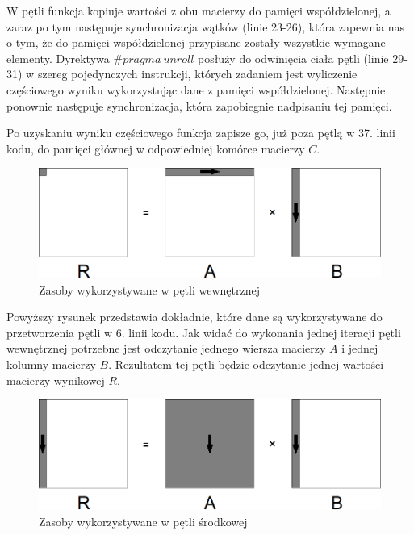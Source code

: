 \documentclass{article}
\begin{document}
W pętli funkcja kopiuje wartości z obu macierzy do pamięci współdzielonej, a zaraz po tym następuje synchronizacja wątków (linie 23-26), która zapewnia nas o tym, że do pamięci współdzielonej przypisane zostały wszystkie wymagane elementy. Dyrektywa $\#pragma\ unroll$ posłuży do odwinięcia ciała pętli (linie 29-31) w szereg pojedynczych instrukcji, których zadaniem jest wyliczenie częściowego wyniku wykorzystując dane z pamięci współdzielonej. Następnie ponownie następuje synchronizacja, która zapobiegnie nadpisaniu tej pamięci.

Po uzyskaniu wyniku częściowego funkcja zapisze go, już poza pętlą w 37. linii kodu, do pamięci głównej w odpowiedniej komórce macierzy $C$.

\begin{figure}[H]
	\centering
	\includegraphics[width=\linewidth]{./images/3/lokIn.png}
	\caption{Zasoby wykorzystywane w pętli wewnętrznej}
	\label{fig:3inner}
\end{figure}

Powyższy rysunek przedstawia dokładnie, które dane są wykorzystywane do przetworzenia pętli w 6. linii kodu. Jak widać do wykonania jednej iteracji pętli wewnętrznej potrzebne jest odczytanie jednego wiersza macierzy $A$ i jednej kolumny macierzy $B$. Rezultatem tej pętli będzie odczytanie jednej wartości macierzy wynikowej $R$.

\begin{figure}[H]
	\centering
	\includegraphics[width=\linewidth]{./images/3/lokMed.png}
	\caption{Zasoby wykorzystywane w pętli środkowej}
	\label{fig:3medium}
\end{figure}
\end{document}
